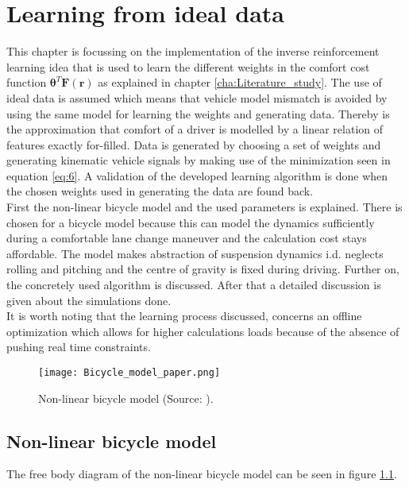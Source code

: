 \chapter{Learning from ideal data}
\label{cha:Learning_algorithm}

This chapter is focussing on the implementation of the inverse reinforcement learning idea that is used to learn the different weights in the comfort cost function $\bm{\theta}^T\bm{F}(\bm{r})$ as
explained in chapter \ref{cha:Literature_study}. The use of ideal data is assumed which means that vehicle model mismatch is avoided by using the same model for learning the weights and generating data. Thereby is the approximation that comfort of a driver is modelled by a linear relation of features exactly for-filled. Data is generated by choosing a set of weights and generating kinematic vehicle signals by making use of the minimization seen in equation \ref{eq:6}. A validation of the developed learning algorithm is done when the chosen weights used in generating the data are found back.\\

First the non-linear bicycle model and the used parameters is explained. There is chosen for a bicycle model because this can model the dynamics sufficiently during a comfortable lane change maneuver and the calculation cost stays affordable. The model makes abstraction of suspension dynamics i.d. neglects rolling and pitching and the centre of gravity is fixed during driving. \cite{Yankov}  Further on, the concretely used algorithm is discussed. After that a detailed discussion is given about the simulations done.\\
It is worth noting that the learning process discussed, concerns an offline optimization which allows for higher calculations loads because of the absence of pushing real time constraints.

\begin{figure}[h!]
	\centering
	\texttt{[image: Bicycle\_model\_paper.png]}
	\caption{Non-linear bicycle model (Source: \cite{TongDuySon2019}).}
	\label{fig:bicycle_model}
\end{figure}
\section{Non-linear bicycle model}\label{sec:Vehicle_models}
The free body diagram of the non-linear bicycle model can be seen in figure \ref{fig:bicycle_model}.



